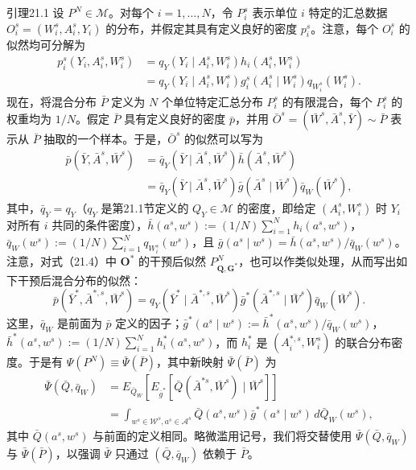 \begin{bookresult}{引理}{21.1}
设 $P^N\in\mathcal M$。对每个 $i=1,\ldots,N$，令 $P_i^s$ 表示单位 $i$ 特定的汇总数据 $O_i^s=(W_i^s,A_i^s,Y_i)$ 的分布，并假定其具有定义良好的密度 $p_i^s$。注意，每个 $O_i^s$ 的似然均可分解为
\begin{equation}
 \begin{aligned}
 p_i^s(Y_i,A_i^s,W_i^s)
 &=q_Y(Y_i\mid A_i^s,W_i^s)h_i(A_i^s,W_i^s)\\
 &=q_Y(Y_i\mid A_i^s,W_i^s)g_i^s(A_i^s\mid W_i^s)q_{W_i^s}(W_i^s).
 \end{aligned}
 \tag{21.9}
\end{equation}
现在，将混合分布 $\bar P$ 定义为 $N$ 个单位特定汇总分布 $P_i^s$ 的有限混合，每个 $P_i^s$ 的权重均为 $1/N$。假定 $\bar P$ 具有定义良好的密度 $\bar p$，并用 $\bar O^s=(\bar W^s,\bar A^s,\bar Y)\sim\bar P$ 表示从 $\bar P$ 抽取的一个样本。于是，$\bar O^s$ 的似然可以写为
\begin{equation}
 \begin{aligned}
 \bar p(\bar Y,\bar A^s,\bar W^s)
 &=\bar q_Y(\bar Y\mid\bar A^s,\bar W^s)\bar h(\bar A^s,\bar W^s)\\
 &=\bar q_Y(\bar Y\mid\bar A^s,\bar W^s)\bar g(\bar A^s\mid\bar W^s)\bar q_W(\bar W^s),
 \end{aligned}
 \tag{21.10}
\end{equation}
其中，$\bar q_Y=q_Y$（$q_Y$ 是第21.1节定义的 $Q_Y\in\mathcal M$ 的密度，即给定 $(A_i^s,W_i^s)$ 时 $Y_i$ 对所有 $i$ 共同的条件密度），$\bar h(a^s,w^s):=(1/N)\sum_{i=1}^N h_i(a^s,w^s)$，$\bar q_W(w^s):=(1/N)\sum_{i=1}^N q_{W_i^s}(w^s)$，且 $\bar g(a^s\mid w^s)=\bar h(a^s,w^s)/\bar q_W(w^s)$。注意，对式（21.4）中 $\bm O^*$ 的干预后似然 $P_{\bm Q,\bm G^*}^N$，也可以作类似处理，从而写出如下干预后混合分布的似然：
\begin{equation}
 \bar p(\bar Y^*,\bar A^{*,s},\bar W^s)
 =q_Y(\bar Y^*\mid\bar A^{*,s},\bar W^s)
 \bar g^*(\bar A^{*,s}\mid\bar W^s)\bar q_W(\bar W^s).
 \tag{21.11}
\end{equation}
这里，$\bar q_W$ 是前面为 $\bar p$ 定义的因子；$\bar g^*(a^s\mid w^s):=\bar h^*(a^s,w^s)/\bar q_W(w^s)$，$\bar h^*(a^s,w^s):=(1/N)\sum_{i=1}^N h_i^*(a^s,w^s)$，而 $h_i^*$ 是 $(A_i^{*,s},W_i^s)$ 的联合分布密度。于是有 $\Psi(P^N)\equiv\bar\Psi(\bar P)$，其中新映射 $\bar\Psi(\bar P)$ 为
\[
 \begin{aligned}
 \bar\Psi(\bar Q,\bar q_W)
 &=E_{\bar Q_W}\left[E_{\bar g^*}[\bar Q(\bar A^{*s},\bar W^s)\mid\bar W^s]\right]\\
 &=\int_{w^s\in\mathcal W^s,a^s\in\mathcal A^s}
 \bar Q(a^s,w^s)\bar g^*(a^s\mid w^s)\,d\bar Q_W(w^s),
 \end{aligned}
\]
其中 $\bar Q(a^s,w^s)$ 与前面的定义相同。略微滥用记号，我们将交替使用 $\bar\Psi(\bar Q,\bar q_W)$ 与 $\bar\Psi(\bar P)$，以强调 $\bar\Psi$ 只通过 $(\bar Q,\bar q_W)$ 依赖于 $\bar P$。
\end{bookresult}


